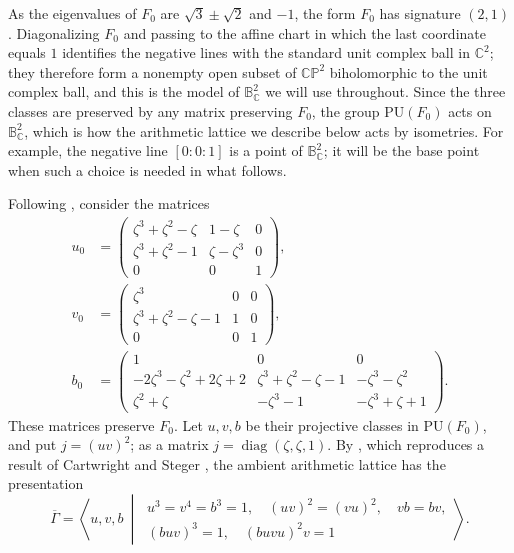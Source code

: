 \documentclass[11pt]{amsart}
\theoremstyle{definition}
\theoremstyle{remark}
\newcommand{\C}{\mathbb C}
\newcommand{\CP}{\mathbb{CP}}
\newcommand{\B}{\mathbb B^2_{\C}}
\newcommand{\GammaMax}{\overline\Gamma}
\begin{document}
As the eigenvalues of $F_0$ are $\sqrt3\pm\sqrt2$ and $-1$, the form
$F_0$ has signature $(2,1)$.  Diagonalizing $F_0$ and passing to the
affine chart in which the last coordinate equals $1$ identifies the
negative lines with the standard unit complex ball in $\C^2$; they therefore
form a nonempty open subset of $\CP^2$ biholomorphic to the unit complex ball,
and this is the model of $\B$ we will use throughout.
Since the three classes are preserved
by any matrix preserving $F_0$, the group $\mathrm{PU}(F_0)$ acts on
$\B$, which is how the arithmetic lattice we describe below acts by isometries.
For example, the negative line $[0:0:1]$ is a point of $\B$; it will
be the base point when such a choice is needed in what follows.

Following \cite{CKY}, consider the matrices
\begin{align}
 u_0&=
 \begin{pmatrix}
 \zeta^3+\zeta^2-\zeta&1-\zeta&0\\
 \zeta^3+\zeta^2-1&\zeta-\zeta^3&0\\
 0&0&1
 \end{pmatrix},\label{eq:u0}\\[3pt]
 v_0&=
 \begin{pmatrix}
 \zeta^3&0&0\\
 \zeta^3+\zeta^2-\zeta-1&1&0\\
 0&0&1
 \end{pmatrix},\label{eq:v0}\\[3pt]
 b_0&=
 \begin{pmatrix}
 1&0&0\\
 -2\zeta^3-\zeta^2+2\zeta+2&
 \zeta^3+\zeta^2-\zeta-1&-\zeta^3-\zeta^2\\
 \zeta^2+\zeta&-\zeta^3-1&-\zeta^3+\zeta+1
 \end{pmatrix}.\label{eq:b0}
\end{align}
These matrices preserve $F_0$.  Let $u,v,b$ be their projective classes in
$\mathrm{PU}(F_0)$, and put $j=(uv)^2$; as a matrix
$j=\operatorname{diag}(\zeta,\zeta,1)$.  By
\cite[Theorem~1]{CKY}, which reproduces a result of Cartwright and Steger
\cite{CS2}, the ambient arithmetic lattice has the presentation
\[
 \GammaMax=
 \left\langle u,v,b\ \middle|\
 \begin{array}{c}
 u^3=v^4=b^3=1,\quad (uv)^2=(vu)^2,\quad vb=bv,\\
 (buv)^3=1,\quad (buvu)^2v=1
 \end{array}
 \right\rangle .
\]
\end{document}
